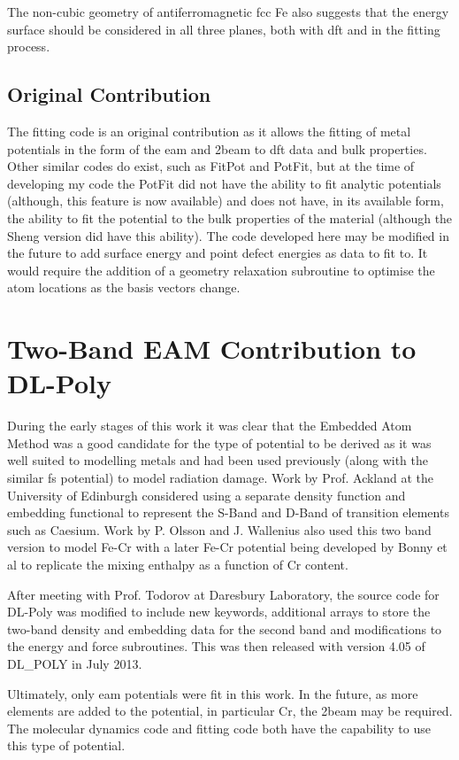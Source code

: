 The non-cubic geometry of antiferromagnetic \acrshort{fcc} Fe also suggests that the energy surface should be considered in all three planes, both with \acrshort{dft} and in the fitting process.



\subsection{Original Contribution}

The fitting code is an original contribution as it allows the fitting of metal potentials in the form of the \acrlong{eam} and \acrlong{2beam} to \acrshort{dft} data and bulk properties.  Other similar codes do exist, such as FitPot and PotFit, but at the time of developing my code the PotFit did not have the ability to fit analytic potentials (although, this feature is now available) and does not have, in its available form, the ability to fit the potential to the bulk properties of the material (although the Sheng version did have this ability).  The code developed here may be modified in the future to add surface energy and point defect energies as data to fit to.  It would require the addition of a geometry relaxation subroutine to optimise the atom locations as the basis vectors change. 



\section{Two-Band EAM Contribution to DL-Poly}

During the early stages of this work it was clear that the Embedded Atom Method was a good candidate for the type of potential to be derived as it was well suited to modelling metals and had been used previously (along with the similar \acrshort{fs} potential) to model radiation damage\cite{damagebcciron}.  Work by Prof. Ackland at the University of Edinburgh considered using a separate density function and embedding functional to represent the S-Band and D-Band of transition elements such as Caesium.  Work by P. Olsson and J. Wallenius also used this two band version to model Fe-Cr with a later Fe-Cr potential being developed by Bonny et al to replicate the mixing enthalpy as a function of Cr content.  

After meeting with Prof. Todorov at Daresbury Laboratory, the source code for DL-Poly was modified to include new keywords, additional arrays to store the two-band density and embedding data for the second band and modifications to the energy and force subroutines.  This was then released with version 4.05 of DL\_POLY in July 2013.  

Ultimately, only \acrshort{eam} potentials were fit in this work.  In the future, as more elements are added to the potential, in particular Cr, the \acrshort{2beam} may be required.  The molecular dynamics code and fitting code both have the capability to use this type of potential.







